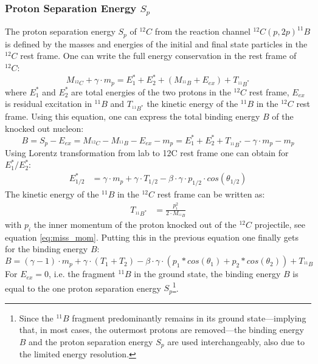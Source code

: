 \subsubsection{Proton Separation Energy $S_p$}
The proton separation energy $S_p$ of $^{12}C$ from the reaction channel $^{12}C(p,2p)^{11}B$ is defined by the masses and energies of the initial and final state particles in the $^{12}C$ rest frame. One can write the full energy conservation in the rest frame of $^{12}C$:
\begin{equation}
M_{^{12}C} + \gamma \cdot m_p = E_1^* + E_2^* + (M_{^{11}B} + E_{ex})  + T_{^{11}B^*}
\end{equation}
where $E_1^*$ and $E_2^*$ are total energies of the two protons in the $^{12}C$ rest frame, $E_{ex}$ is residual excitation in $^{11}B$ and $T_{^{11}B^*}$ the kinetic energy of the $^{11}B$ in the $^{12}C$ rest frame.\newline
Using this equation, one can express the total binding energy $B$ of the knocked out nucleon:
\begin{equation}
B = S_p - E_{ex} = M_{^{12}C} - M_{^{11}B} - E_{ex} - m_p = E_1^* + E_2^* + T_{^{11}B^*} - \gamma \cdot m_p - m_p
\end{equation}
Using Lorentz transformation from lab to 12C rest frame one can obtain for $E_1^*/E_2^*$:
\begin{align*}
E_{1/2}^* &=  \gamma \cdot m_p + \gamma \cdot T_{1/2} - \beta \cdot \gamma \cdot p_{1/2} \cdot cos(\theta_{1/2})
\end{align*}
The kinetic energy of the $^{11}B$ in the $^{12}C$ rest frame can be written as:
\begin{align*}
T_{^{11}B^*} &= \frac{p_i^2}{2 \cdot M_{^{11}B}}
\end{align*}
with $p_i$ the inner momentum of the proton knocked out of the $^{12}C$ projectile, see equation \ref{eq:miss_mom}.
Putting this in the previous equation one finally gets for the binding energy $B$:
\begin{equation}
B = (\gamma - 1)\cdot m_p + \gamma \cdot (T_1+T_2) - \beta \cdot \gamma \cdot(p_1*cos(\theta_1) + p_2*cos(\theta_2)) + T_{^{11}B}
\end{equation}\label{eq:sep_energy}
For $E_{ex} = 0$, i.e. the fragment $^{11}B$ in the ground state, the binding energy $B$ is equal to the one proton separation energy $S_p$\footnote{Since the $^{11}B$ fragment predominantly remains in its ground state---implying that, in most cases, the outermost protons are removed---the binding energy $B$ and the proton separation energy $S_p$ are used interchangeably, also due to the limited energy resolution.}. \newline
